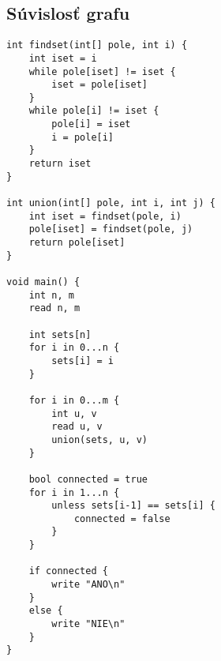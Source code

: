 \documentclass{article}
\begin{document}
    \subsection{Súvislosť grafu}
        \begin{lstlisting}
int findset(int[] pole, int i) {
    int iset = i
    while pole[iset] != iset {
        iset = pole[iset]
    }
    while pole[i] != iset {
        pole[i] = iset
        i = pole[i]
    }
    return iset
}

int union(int[] pole, int i, int j) {
    int iset = findset(pole, i)
    pole[iset] = findset(pole, j)
    return pole[iset]
}

void main() {
    int n, m
    read n, m

    int sets[n]
    for i in 0...n {
        sets[i] = i
    }

    for i in 0...m {
        int u, v
        read u, v
        union(sets, u, v)
    }

    bool connected = true
    for i in 1...n {
        unless sets[i-1] == sets[i] {
            connected = false
        }
    }

    if connected {
        write "ANO\n"
    }
    else {
        write "NIE\n"
    }
}

        \end{lstlisting}
\end{document}
